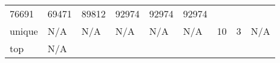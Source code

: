 \begin{longtable}[]{@{}lllllllll@{}}
\begin{minipage}[t]{0.09\columnwidth}
76691\strut
\end{minipage} & \begin{minipage}[t]{0.08\columnwidth}\raggedright
69471\strut
\end{minipage} & \begin{minipage}[t]{0.09\columnwidth}\raggedright
89812\strut
\end{minipage} & \begin{minipage}[t]{0.09\columnwidth}\raggedright
92974\strut
\end{minipage} & \begin{minipage}[t]{0.08\columnwidth}\raggedright
92974\strut
\end{minipage} & \begin{minipage}[t]{0.11\columnwidth}\raggedright
92974\strut
\end{minipage}\tabularnewline
\begin{minipage}[t]{0.05\columnwidth}\raggedright
unique\strut
\end{minipage} & \begin{minipage}[t]{0.08\columnwidth}\raggedright
N/A\strut
\end{minipage} & \begin{minipage}[t]{0.09\columnwidth}\raggedright
N/A\strut
\end{minipage} & \begin{minipage}[t]{0.09\columnwidth}\raggedright
N/A\strut
\end{minipage} & \begin{minipage}[t]{0.08\columnwidth}\raggedright
N/A\strut
\end{minipage} & \begin{minipage}[t]{0.09\columnwidth}\raggedright
N/A\strut
\end{minipage} & \begin{minipage}[t]{0.09\columnwidth}\raggedright
10\strut
\end{minipage} & \begin{minipage}[t]{0.08\columnwidth}\raggedright
3\strut
\end{minipage} & \begin{minipage}[t]{0.11\columnwidth}\raggedright
N/A\strut
\end{minipage}\tabularnewline
\begin{minipage}[t]{0.05\columnwidth}\raggedright
top\strut
\end{minipage} & \begin{minipage}[t]{0.08\columnwidth}\raggedright
N/A\strut
\end{minipage} & \begin{minipage}[t]{0.09\columnwidth}\raggedright

\end{minipage}
\end{longtable}
